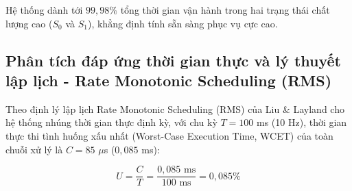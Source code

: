 Hệ thống dành tới $99{,}98\%$ tổng thời gian vận hành trong hai trạng thái chất lượng cao ($S_0$ và $S_1$), khẳng định tính sẵn sàng phục vụ cực cao.

\subsection{Phân tích đáp ứng thời gian thực và lý thuyết lập lịch - Rate Monotonic Scheduling (RMS)}

\hspace{0.5cm} Theo định lý lập lịch Rate Monotonic Scheduling (RMS) của Liu \& Layland cho hệ thống nhúng thời gian thực định kỳ, với chu kỳ $T = 100$ ms (10 Hz), thời gian thực thi tình huống xấu nhất (Worst-Case Execution Time, WCET) của toàn chuỗi xử lý là $C = 85$ $\mu$s ($0{,}085$ ms):

\begin{equation}
U = \frac{C}{T} = \frac{0{,}085\text{ ms}}{100\text{ ms}} = 0{,}085\%
\label{eq:cpu-utilization-formula}
\end{equation}

